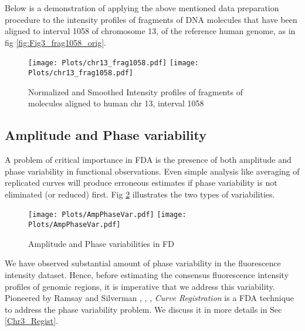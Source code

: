 Below is a demonstration of applying the above mentioned data preparation procedure to the intensity profiles of fragments of DNA molecules that have been aligned to interval 1058 of chromosome 13, of the reference human genome, as in fig \ref{fig:Fig3_frag1058_orig}.
\begin{figure}[H]
\begin{center}
\texttt{[image: Plots/chr13\_frag1058.pdf]}
\texttt{[image: Plots/chr13\_frag1058.pdf]}
\end{center}
\caption{Normalized and Smoothed Intensity profiles of fragments of molecules aligned to human chr 13, interval 1058}
\label{fig:Fig3_frag1058_norm}
\end{figure}


\subsection{Amplitude and Phase variability}
A problem of critical importance in FDA is the presence of both amplitude and phase variability in functional observations. Even simple analysis like averaging of replicated curves will produce erroneous estimates if phase variability is not eliminated (or reduced) first. Fig \ref{fig:Fig3_AmpPhase} illustrates the two types of variabilities. 
\begin{figure}[H]
\begin{center}
\texttt{[image: Plots/AmpPhaseVar.pdf]}
\texttt{[image: Plots/AmpPhaseVar.pdf]}
\end{center}
\caption{Amplitude and Phase variabilities in FD}
\label{fig:Fig3_AmpPhase}
\end{figure}
We have observed substantial amount of phase variability in the fluorescence intensity dataset. Hence, before estimating the consensus fluorescence intensity profiles of genomic regions, it is imperative that we address this variability. Pioneered by Ramsay and Silverman \cite{Ramsay_2006_Functional}, \cite{Ramsay_Li_1998_JRSSB}, \cite{Ramsay_etal_2009_Functional_R}, {\emph{Curve Registration}} is a FDA technique to address the phase variability problem. We discuss it in more details in Sec \ref{Chr3_Regist}.

